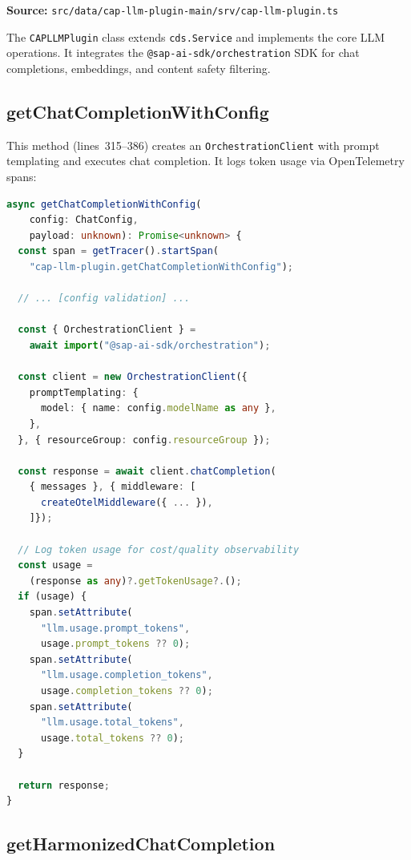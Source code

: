 \documentclass[11pt]{article}
\begin{document}
\noindent\textbf{Source:}
\texttt{src/data/cap-llm-plugin-main/srv/cap-llm-plugin.ts}

The \texttt{CAPLLMPlugin} class extends \texttt{cds.Service} and implements
the core LLM operations. It integrates the \texttt{@sap-ai-sdk/orchestration}
SDK for chat completions, embeddings, and content safety filtering.

\subsection{getChatCompletionWithConfig}

This method (lines~315--386) creates an \texttt{OrchestrationClient} with
prompt templating and executes chat completion. It logs token usage via
OpenTelemetry spans:

\begin{lstlisting}[language=TypeScript,caption={getChatCompletionWithConfig with token logging (cap-llm-plugin.ts, lines 315--365)},firstnumber=315]
async getChatCompletionWithConfig(
    config: ChatConfig,
    payload: unknown): Promise<unknown> {
  const span = getTracer().startSpan(
    "cap-llm-plugin.getChatCompletionWithConfig");

  // ... [config validation] ...

  const { OrchestrationClient } =
    await import("@sap-ai-sdk/orchestration");

  const client = new OrchestrationClient({
    promptTemplating: {
      model: { name: config.modelName as any },
    },
  }, { resourceGroup: config.resourceGroup });

  const response = await client.chatCompletion(
    { messages }, { middleware: [
      createOtelMiddleware({ ... }),
    ]});

  // Log token usage for cost/quality observability
  const usage =
    (response as any)?.getTokenUsage?.();
  if (usage) {
    span.setAttribute(
      "llm.usage.prompt_tokens",
      usage.prompt_tokens ?? 0);
    span.setAttribute(
      "llm.usage.completion_tokens",
      usage.completion_tokens ?? 0);
    span.setAttribute(
      "llm.usage.total_tokens",
      usage.total_tokens ?? 0);
  }

  return response;
}
\end{lstlisting}

\subsection{getHarmonizedChatCompletion}
\end{document}
